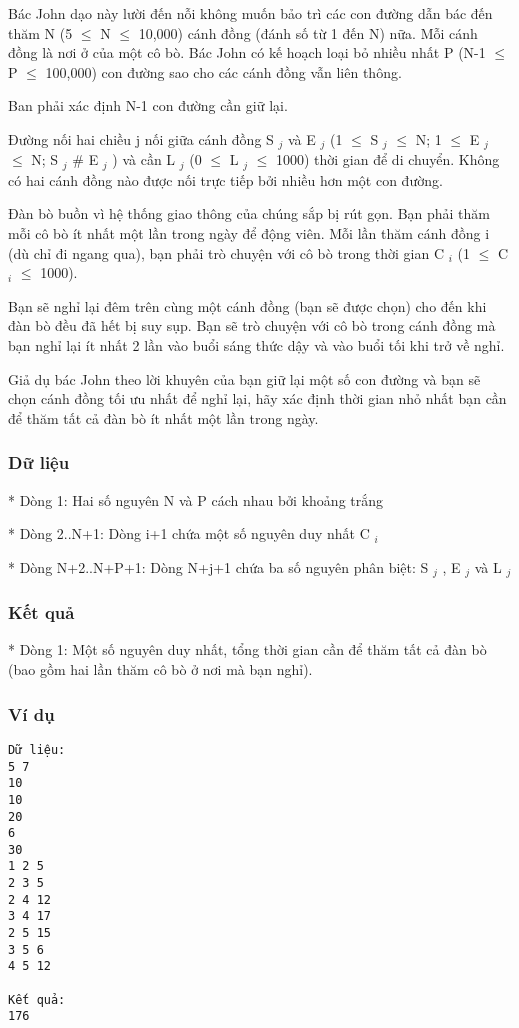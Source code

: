 



   Bác John dạo này lười đến nỗi không muốn bảo trì các con đường dẫn bác đến thăm N (5  $\le$  N  $\le$  10,000) cánh đồng (đánh số từ 1 đến N) nữa. Mỗi cánh đồng là nơi ở của một cô bò. Bác John có kế hoạch loại bỏ nhiều nhất P (N-1  $\le$  P  $\le$  100,000) con đường sao cho các cánh đồng vẫn liên thông.  

   Ban phải xác định N-1 con đường cần giữ lại.  

   Đường nối hai chiều j nối giữa cánh đồng S   $_    j   $   và E   $_    j   $   (1  $\le$  S   $_    j   $    $\le$  N; 1  $\le$  E   $_    j   $    $\le$  N; S   $_    j   $   \# E   $_    j   $   ) và cần L   $_    j   $   (0  $\le$  L   $_    j   $    $\le$  1000) thời gian để di chuyển. Không có hai cánh đồng nào được nối trực tiếp bởi nhiều hơn một con đường.  

   Đàn bò buồn vì hệ thống giao thông của chúng sắp bị rút gọn. Bạn phải thăm mỗi cô bò ít nhất một lần trong ngày để động viên. Mỗi lần thăm cánh đồng i (dù chỉ đi ngang qua), bạn phải trò chuyện với cô bò trong thời gian C   $_    i   $   (1  $\le$  C   $_    i   $    $\le$  1000).  

   Bạn sẽ nghỉ lại đêm trên cùng một cánh đồng (bạn sẽ được chọn) cho đến khi đàn bò đều đã hết bị suy sụp. Bạn sẽ trò chuyện với cô bò trong cánh đồng mà bạn nghỉ lại ít nhất 2 lần vào buổi sáng thức dậy và vào buổi tối khi trở về nghỉ.  

   Giả dụ bác John theo lời khuyên của bạn giữ lại một số con đường và bạn sẽ chọn cánh đồng tối ưu nhất để nghỉ lại, hãy xác định thời gian nhỏ nhất bạn cần để thăm tất cả đàn bò ít nhất một lần trong ngày.  

\subsubsection{   Dữ liệu  }

   * Dòng 1: Hai số nguyên N và P cách nhau bởi khoảng trắng  

   * Dòng 2..N+1: Dòng i+1 chứa một số nguyên duy nhất C   $_    i   $

   * Dòng N+2..N+P+1: Dòng N+j+1 chứa ba số nguyên phân biệt: S   $_    j   $   , E   $_    j   $   và L   $_    j   $

\subsubsection{   Kết quả  }

   * Dòng 1: Một số nguyên duy nhất, tổng thời gian cần để thăm tất cả đàn bò (bao gồm hai lần thăm cô bò ở nơi mà bạn nghỉ).  

\subsubsection{   Ví dụ  }
\begin{verbatim}
Dữ liệu:
5 7
10
10
20
6
30
1 2 5
2 3 5
2 4 12
3 4 17
2 5 15
3 5 6
4 5 12

Kết quả:
176
\end{verbatim}
